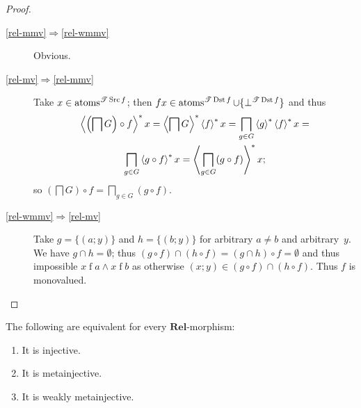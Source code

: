 \begin{proof}
~
\begin{description}
\item [{\ref{rel-mmv}$\Rightarrow$\ref{rel-wmmv}}] Obvious.
\item [{\ref{rel-mv}$\Rightarrow$\ref{rel-mmv}}] Take $x\in\operatorname{atoms}^{\mathscr{T}\operatorname{Src} f}$;
then $fx\in\operatorname{atoms}^{\mathscr{T}\operatorname{Dst} f}\cup\{\bot^{\mathscr{T}\operatorname{Dst} f}\}$ and thus 
\begin{multline*}
\left\langle \left(\bigsqcap G\right)\circ f\right\rangle ^{\ast}x=\left\langle \bigsqcap G\right\rangle ^{\ast}\left\langle f\right\rangle ^{\ast}x=\bigsqcap_{g\in G}\left\langle g\right\rangle ^{\ast}\left\langle f\right\rangle ^{\ast}x=\\
\bigsqcap_{g\in G}\left\langle g\circ f\right\rangle ^{\ast}x=\left\langle \bigsqcap_{g\in G}(g\circ f)\right\rangle ^{\ast}x;
\end{multline*}
so $\left(\bigsqcap G\right)\circ f=\bigsqcap_{g\in G}(g\circ f)$.
\item [{\ref{rel-wmmv}$\Rightarrow$\ref{rel-mv}}] Take $g=\{(a;y)\}$
and $h=\{(b;y)\}$ for arbitrary $a\ne b$ and arbitrary~$y$. We
have $g\cap h=\emptyset$; thus $(g\circ f)\cap(h\circ f)=(g\cap h)\circ f=\emptyset$
and thus impossible $x\mathrel fa\land x\mathrel fb$ as otherwise
$(x;y)\in(g\circ f)\cap(h\circ f)$. Thus $f$ is monovalued.
\end{description}
\end{proof}
\begin{cor}
The following are equivalent for every $\mathbf{Rel}$-morphism:
\begin{enumerate}
\item It is injective.
\item It is metainjective.
\item It is weakly metainjective.
\end{enumerate}
\end{cor}

